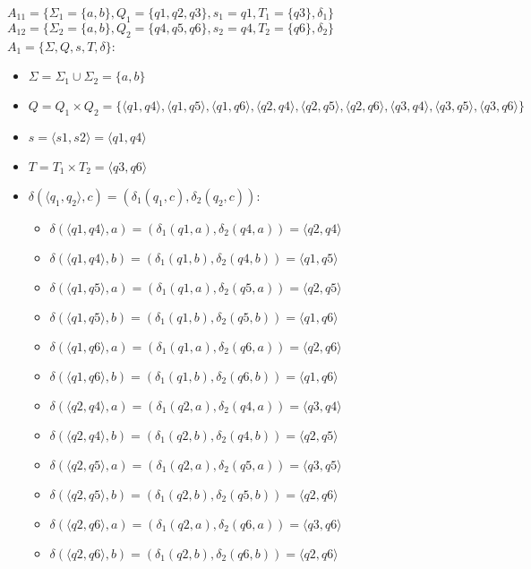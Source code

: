 \documentclass[12pt, a4paper]{article}
\begin{document}
\begin{enumerate}
\(A_{11}=\{\Sigma_1=\{a,b\}, Q_1=\{q1,q2,q3\}, s_1=q1, T_1=\{q3\}, \delta_1\} \)
\\\(A_{12}=\{\Sigma_2=\{a,b\}, Q_2=\{q4,q5,q6\}, s_2=q4, T_2=\{q6\}, \delta_2\} \)
\\\(A_1=\{\Sigma, Q, s, T, \delta\} \):
\begin{itemize}
    \item \(\Sigma=\Sigma_1 \cup \Sigma_2=\{a,b\} \)
    \item \(Q=Q_1 \times Q_2=\{\langle q1,q4 \rangle, \langle q1,q5 \rangle, \langle q1,q6 \rangle, \langle q2,q4 \rangle, \langle q2,q5 \rangle, \langle q2,q6 \rangle, \langle q3,q4 \rangle, \langle q3,q5 \rangle, \langle q3,q6 \rangle\}\)
    \item \(s=\langle s1,s2 \rangle = \langle q1,q4 \rangle\)
    \item \(T=T_1 \times T_2= \langle q3,q6 \rangle\)
    \item \(\delta(\langle q_1,q_2 \rangle,c)=(\delta_1(q_1,c),\delta_2(q_2,c))\):
    \begin{itemize}
        \item \(\delta(\langle q1,q4 \rangle,a)=(\delta_1(q1,a),\delta_2(q4,a))=\langle q2,q4 \rangle\)
        \item \(\delta(\langle q1,q4 \rangle,b)=(\delta_1(q1,b),\delta_2(q4,b))=\langle q1,q5 \rangle\)
        \item \(\delta(\langle q1,q5 \rangle,a)=(\delta_1(q1,a),\delta_2(q5,a))=\langle q2,q5 \rangle\)
        \item \(\delta(\langle q1,q5 \rangle,b)=(\delta_1(q1,b),\delta_2(q5,b))=\langle q1,q6 \rangle\)
        \item \(\delta(\langle q1,q6 \rangle,a)=(\delta_1(q1,a),\delta_2(q6,a))=\langle q2,q6 \rangle\)
        \item \(\delta(\langle q1,q6 \rangle,b)=(\delta_1(q1,b),\delta_2(q6,b))=\langle q1,q6 \rangle\)
        
        \item \(\delta(\langle q2,q4 \rangle,a)=(\delta_1(q2,a),\delta_2(q4,a))=\langle q3,q4 \rangle\)
        \item \(\delta(\langle q2,q4 \rangle,b)=(\delta_1(q2,b),\delta_2(q4,b))=\langle q2,q5 \rangle\)
        \item \(\delta(\langle q2,q5 \rangle,a)=(\delta_1(q2,a),\delta_2(q5,a))=\langle q3,q5 \rangle\)
        \item \(\delta(\langle q2,q5 \rangle,b)=(\delta_1(q2,b),\delta_2(q5,b))=\langle q2,q6 \rangle\)
        \item \(\delta(\langle q2,q6 \rangle,a)=(\delta_1(q2,a),\delta_2(q6,a))=\langle q3,q6 \rangle\)
        \item \(\delta(\langle q2,q6 \rangle,b)=(\delta_1(q2,b),\delta_2(q6,b))=\langle q2,q6 \rangle\)
        

\end{itemize}
\end{itemize}
\end{enumerate}
\end{document}
